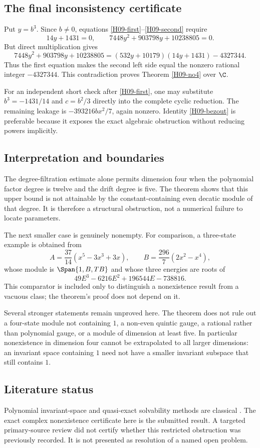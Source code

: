 \documentclass[11pt,a4paper]{article}
\theoremstyle{definition}\newtheorem{definition}[theorem]{Definition}
\theoremstyle{remark}\newtheorem{remark}[theorem]{Remark}
\numberwithin{equation}{section}
\begin{document}
\subsection{The final inconsistency certificate}\label{H09-sec-5}
Put $y=b^3$. Since $b\ne0$, equations \eqref{H09-first}--\eqref{H09-second} require
\[14y+1431=0,\qquad 7448y^2+903798y+10238805=0.
\]
But direct multiplication gives
\begin{equation}\label{H09-bezout}
7448y^2+903798y+10238805
=(532y+10179)(14y+1431)-4327344.
\end{equation}
Thus the first equation makes the second left side equal the nonzero rational integer $-4327344$. This contradiction proves Theorem \ref{H09-no4} over $\C$.

For an independent short check after \eqref{H09-first}, one may substitute $b^3=-1431/14$ and $c=b^2/3$ directly into the complete cyclic reduction. The remaining leakage is $-393216b x^2/7$, again nonzero. Identity \eqref{H09-bezout} is preferable because it exposes the exact algebraic obstruction without reducing powers implicitly.
\subsection{Interpretation and boundaries}\label{H09-sec-6}
The degree-filtration estimate alone permits dimension four when the polynomial factor degree is twelve and the drift degree is five. The theorem shows that this upper bound is not attainable by the constant-containing even decatic module of that degree. It is therefore a structural obstruction, not a numerical failure to locate parameters.

The next smaller case is genuinely nonempty. For comparison, a three-state example is obtained from
\[A=\frac{37}{14}(x^5-3x^3+3x),\qquad B=\frac{296}{7}(2x^2-x^4),
\]
whose module is $\Span\{1,B,TB\}$ and whose three energies are roots of
\[49E^3-6216E^2+196544E-738816.
\]
This comparator is included only to distinguish a nonexistence result from a vacuous class; the theorem's proof does not depend on it.

Several stronger statements remain unproved here. The theorem does not rule out a four-state module not containing $1$, a non-even quintic gauge, a rational rather than polynomial gauge, or a module of dimension at least five. In particular nonexistence in dimension four cannot be extrapolated to all larger dimensions: an invariant space containing $1$ need not have a smaller invariant subspace that still contains $1$.
\subsection{Literature status}\label{H09-sec-7}
Polynomial invariant-space and quasi-exact solvability methods are classical \cite{ref083,ref088}. The exact complex nonexistence certificate here is the submitted result. A targeted primary-source review did not certify whether this restricted obstruction was previously recorded. It is not presented as resolution of a named open problem.
\end{document}
